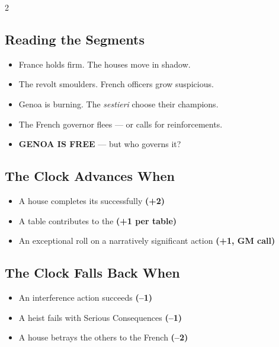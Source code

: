 \begin{multicols}{2}

\subsection{Reading the Segments}

\begin{itemize}
  \item[\textbf{1--2}] France holds firm. The houses move in shadow.
  \item[\textbf{3--4}] The revolt smoulders. French officers grow suspicious.
  \item[\textbf{5--6}] Genoa is burning. The \textit{sestieri} choose their champions.
  \item[\textbf{7}]    The French governor flees --- or calls for reinforcements.
  \item[\textbf{8}]    \textbf{GENOA IS FREE} --- but who governs it?
\end{itemize}

\columnbreak

\subsection{The Clock Advances When}
\begin{itemize}
  \item A house completes its  successfully \textbf{(+2)}
  \item A table contributes to the  \textbf{(+1 per table)}
  \item An exceptional roll on a narratively significant action \textbf{(+1, GM call)}
\end{itemize}

\subsection{The Clock Falls Back When}
\begin{itemize}
  \item An interference action succeeds \textbf{(--1)}
  \item A heist fails with Serious Consequences \textbf{(--1)}
  \item A house betrays the others to the French \textbf{(--2)}
\end{itemize}

\end{multicols}

